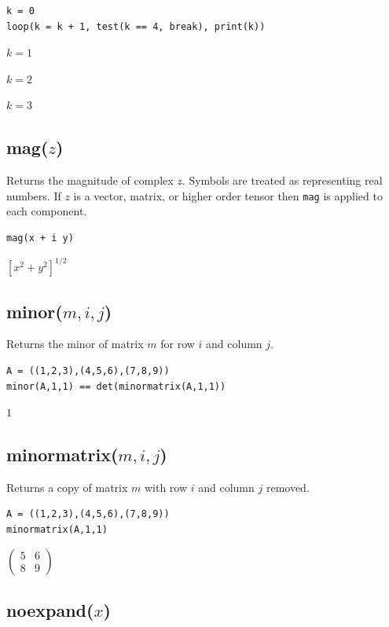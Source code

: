 \documentclass[12pt]{article}
\begin{document}
{\color{blue}
\begin{verbatim}
k = 0
loop(k = k + 1, test(k == 4, break), print(k))
\end{verbatim}
}

$k=1$

$k=2$

$k=3$

\subsection*{mag($z$)}

Returns the magnitude of complex $z$.
Symbols are treated as representing real numbers.
If $z$ is a vector, matrix, or higher order tensor then
\verb$mag$ is applied to each component.

{\color{blue}
\begin{verbatim}
mag(x + i y)
\end{verbatim}
}

$\displaystyle
\left[x^2+y^2\right]^{1/2}
$

\subsection*{minor($m,i,j$)}

Returns the minor of matrix $m$ for row $i$ and column $j$.

{\color{blue}
\begin{verbatim}
A = ((1,2,3),(4,5,6),(7,8,9))
minor(A,1,1) == det(minormatrix(A,1,1))
\end{verbatim}
}

$1$

\subsection*{minormatrix($m,i,j$)}

Returns a copy of matrix $m$ with row $i$ and column $j$ removed.

{\color{blue}
\begin{verbatim}
A = ((1,2,3),(4,5,6),(7,8,9))
minormatrix(A,1,1)
\end{verbatim}
}

$\displaystyle
\begin{pmatrix}
5 & 6
\\[1ex]
8 & 9
\end{pmatrix}
$

\subsection*{noexpand($x$)}
\end{document}
